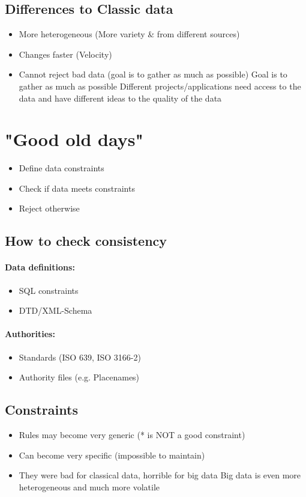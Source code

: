 \documentclass[10pt,a4paper]{scrreprt}
\begin{document}
\subsection{Differences to Classic data}
\begin{itemize}
	\item More heterogeneous (More variety \& from different sources)
	\item Changes faster (Velocity)
	\item Cannot reject bad data (goal is to gather as much as possible)
	\subitem Goal is to gather as much as possible
	\subitem Different projects/applications need access to the data and have different ideas to the quality of the data
\end{itemize}


\section{"Good old days"}
\begin{itemize}
	\item Define data constraints
	\item Check if data meets constraints
	\item Reject otherwise
\end{itemize}


\subsection{How to check consistency}
\paragraph{Data definitions:}
\begin{itemize}
	\item SQL constraints
	\item DTD/XML-Schema
\end{itemize}
\paragraph{Authorities:}
\begin{itemize}
	\item Standards (ISO 639, ISO 3166-2)
	\item Authority files (e.g. Placenames)
\end{itemize}


\subsection{Constraints}
\begin{itemize}
	\item Rules may become very generic (* is NOT a good constraint)
	\item Can become very specific (impossible to maintain)
	\item They were bad for classical data, horrible for big data
	\subitem Big data is even more heterogeneous and much more volatile
\end{itemize}
\end{document}
